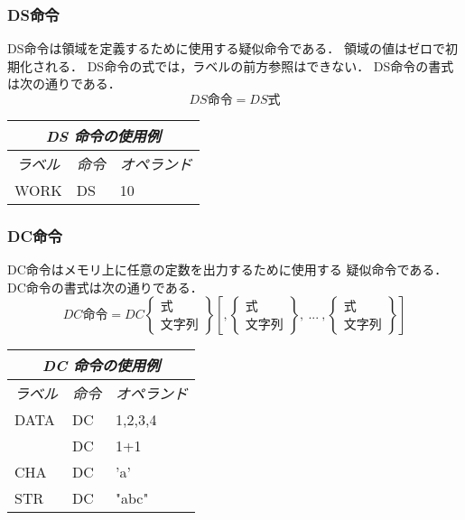\subsubsection{DS命令}
DS命令は領域を定義するために使用する疑似命令である．
領域の値はゼロで初期化される．
DS命令の式では，ラベルの前方参照はできない．
DS命令の書式は次の通りである．
\[ DS命令 = DS　式 \]
\begin{center}
\tt\begin{tabular}{lll}
\hline
\multicolumn{3}{c}{\it DS 命令の使用例} \\
\hline
\multicolumn{1}{c}{\it ラベル} & 
        \multicolumn{1}{c}{\it 命令} & \multicolumn{1}{c}{\it オペランド} \\
WORK  & DS & 10 \\
\hline
\end{tabular}
\end{center}
\vspace{0.2cm}

\subsubsection{DC命令}
DC命令はメモリ上に任意の定数を出力するために使用する
疑似命令である．DC命令の書式は次の通りである．
\[ DC命令 =
 DC　\left\{
  \begin{array}{c}
   式 \\
   文字列
  \end{array}  
 \right\}
[,\left\{
  \begin{array}{c}
   式 \\
   文字列
  \end{array}  
 \right\},~ ...~ ,
\left\{
  \begin{array}{c}
   式 \\
   文字列
  \end{array}  
 \right\}]
\]
\vspace{0.2cm}
\begin{center}
\tt\begin{tabular}{lll}
\hline
\multicolumn{3}{c}{\it DC 命令の使用例} \\
\hline
\multicolumn{1}{c}{\it ラベル} & 
        \multicolumn{1}{c}{\it 命令} & \multicolumn{1}{c}{\it オペランド} \\
DATA & DC & 1,2,3,4 \\
     & DC & 1+1 \\
CHA  & DC & 'a' \\
STR  & DC & "abc" \\
\hline
\end{tabular}
\end{center}
\vspace{0.2cm}

